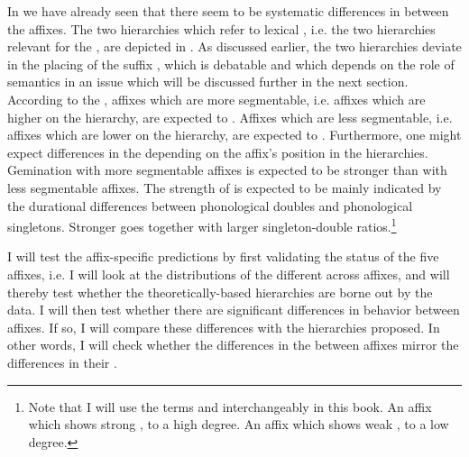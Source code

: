 {{ In  we have already seen that there seem to be systematic differences in  between the affixes. 
The two  hierarchies which refer to lexical , i.e. the two hierarchies relevant for the , are depicted in . As discussed earlier, the two hierarchies deviate in the placing of the suffix , which is debatable and which depends on the role of semantics in  \textendash  an issue which will be discussed further in the next section.
According to the , affixes which are more segmentable, i.e. affixes which are higher on the  hierarchy, are expected to . Affixes which are less segmentable, i.e. affixes which are lower on the hierarchy, are expected to . Furthermore, one might expect differences in the  depending on the affix's position in the hierarchies. Gemination with more segmentable affixes is expected to be stronger than  with less segmentable affixes. The strength of  is expected to be mainly indicated by the durational differences between phonological doubles and phonological singletons. Stronger  goes together with larger singleton-double ratios.\footnote{Note that I will use the terms  and  interchangeably in this book. An affix which shows strong ,  to a high degree. An affix which shows weak ,  to a low degree.}




I will test the affix-specific  predictions by first validating the  status of the five affixes, i.e. I will look at the distributions of the different  across affixes, and will thereby test whether the theoretically-based hierarchies are borne out by the data. I will then test whether there are significant differences in  behavior between affixes. If so, I will compare these differences with the  hierarchies proposed. In other words, I will check whether  the differences in the  between affixes mirror the differences in their .

}}
